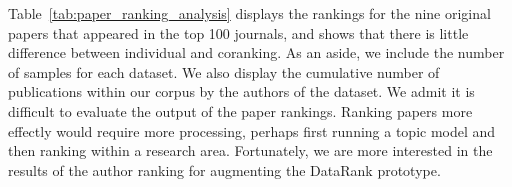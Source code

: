     \begin{table}[h]
    \caption{Paper Ranking: Individual vs. Corank}
    \label{tab:paper_rank}
    \end{table}

Table~\ref{tab:paper_ranking_analysis} displays the rankings for the nine original papers that appeared in the top 100 journals, and shows that there is little difference between individual and coranking. As an aside, we include the number of samples for each dataset. We also display the cumulative number of publications within our corpus by the authors of the dataset. We admit it is difficult to evaluate the output of the paper rankings. Ranking papers more effectly would require more processing, perhaps first running a topic model and then ranking within a research area. Fortunately, we are more interested in the results of the author ranking for augmenting the DataRank prototype.

